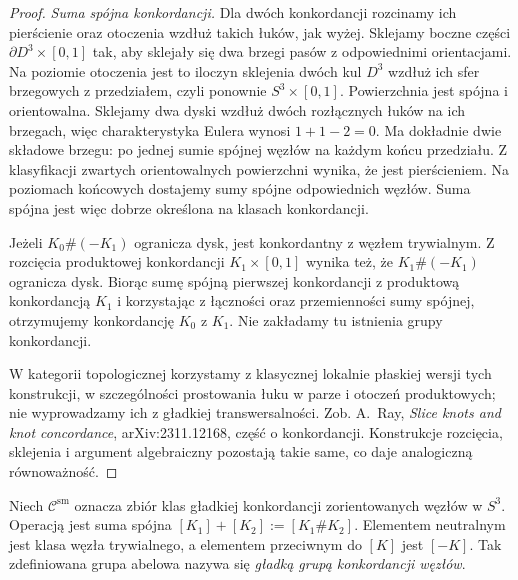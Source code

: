 \begin{proof}
\emph{Suma spójna konkordancji.}
Dla dwóch konkordancji rozcinamy ich pierścienie
oraz otoczenia wzdłuż takich łuków, jak wyżej.
Sklejamy boczne części $\partial D^3\times[0,1]$
tak, aby sklejały się dwa brzegi pasów z
odpowiednimi orientacjami. Na poziomie otoczenia
jest to iloczyn sklejenia dwóch kul $D^3$
wzdłuż ich sfer brzegowych z przedziałem,
czyli ponownie $S^3\times[0,1]$.
Powierzchnia jest spójna i orientowalna.
Sklejamy dwa dyski wzdłuż dwóch rozłącznych
łuków na ich brzegach, więc charakterystyka
Eulera wynosi $1+1-2=0$. Ma dokładnie
dwie składowe brzegu: po jednej sumie
spójnej węzłów na każdym końcu przedziału.
Z klasyfikacji zwartych orientowalnych
powierzchni wynika, że jest pierścieniem.
Na poziomach końcowych dostajemy sumy spójne
odpowiednich węzłów. Suma spójna jest więc
dobrze określona na klasach konkordancji.

Jeżeli $K_0\#(-K_1)$ ogranicza dysk, jest
konkordantny z węzłem trywialnym. Z rozcięcia
produktowej konkordancji $K_1\times[0,1]$
wynika też, że $K_1\#(-K_1)$ ogranicza dysk.
Biorąc sumę spójną pierwszej konkordancji
z produktową konkordancją $K_1$ i korzystając
z łączności oraz przemienności sumy spójnej,
otrzymujemy konkordancję $K_0$ z $K_1$.
Nie zakładamy tu istnienia grupy konkordancji.

W kategorii topologicznej korzystamy z klasycznej
lokalnie płaskiej wersji tych konstrukcji,
w szczególności prostowania łuku w parze
i otoczeń produktowych; nie wyprowadzamy ich
z gładkiej transwersalności. Zob.
A.~Ray, \emph{Slice knots and knot concordance},
arXiv:2311.12168, część o konkordancji.
Konstrukcje rozcięcia, sklejenia i argument
algebraiczny pozostają takie same, co daje
analogiczną równoważność.
\end{proof}

\begin{definicja}
Niech $\mathcal C^{\mathrm{sm}}$ oznacza zbiór klas gładkiej
konkordancji zorientowanych węzłów w $S^3$.
Operacją jest suma spójna $[K_1]+[K_2]:=[K_1\#K_2]$.
Elementem neutralnym jest klasa węzła trywialnego,
a elementem przeciwnym do $[K]$ jest $[-K]$.
Tak zdefiniowana grupa abelowa nazywa się
\emph{gładką grupą konkordancji węzłów}.
\end{definicja}

